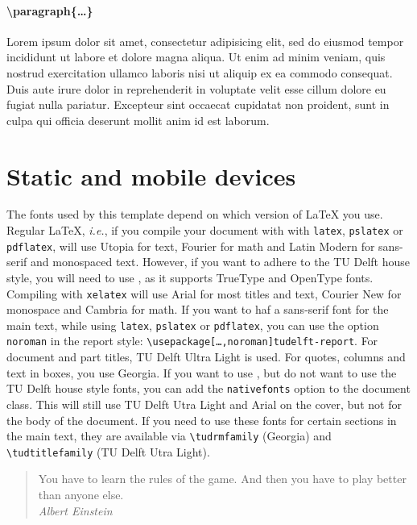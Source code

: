 \paragraph{\textbackslash paragraph\{\ldots\}}
Lorem ipsum dolor sit amet, consectetur adipisicing elit, sed do eiusmod tempor incididunt ut labore et dolore magna aliqua. Ut enim ad minim veniam, quis nostrud exercitation ullamco laboris nisi ut aliquip ex ea commodo consequat. Duis aute irure dolor in reprehenderit in voluptate velit esse cillum dolore eu fugiat nulla pariatur. Excepteur sint occaecat cupidatat non proident, sunt in culpa qui officia deserunt mollit anim id est laborum.

\section{Static and mobile devices}

The fonts used by this template depend on which version of \LaTeX{} you use. Regular \LaTeX, \emph{i.e.}, if you compile your document with with \texttt{latex}, \texttt{pslatex} or \texttt{pdflatex}, will use Utopia for text, Fourier for math and Latin Modern for sans-serif and monospaced text. 
However, if you want to adhere to the TU Delft house style, you will need to use \XeLaTeX, as it supports TrueType and OpenType fonts. Compiling with \texttt{xelatex} will use Arial for most titles and text, Courier New for monospace and Cambria for math. If you want to haf a sans-serif font for the
main text, while using \texttt{latex}, \texttt{pslatex} or \texttt{pdflatex}, you can use the option \texttt{noroman} in the report style: \texttt{\textbackslash usepackage[\ldots,noroman]{tudelft-report}}. For document and part titles,  TU Delft Ultra Light is used. For quotes, columns and text in boxes, you use Georgia. If you want to use \XeLaTeX, but do not want to use the TU Delft house style fonts, you can add the \texttt{nativefonts} option to the document class. This will still use  TU Delft Utra Light and Arial on the cover, but not for the body of the document. If you need to use these fonts for certain sections in the main text, they are available via \texttt{\textbackslash tudrmfamily} (Georgia) and \texttt{\textbackslash tudtitlefamily} (TU Delft Utra Light).

\begin{quote}
  You have to learn the rules of the game. And then you have to play better than anyone else.\\
  \emph{Albert Einstein}
\end{quote}

